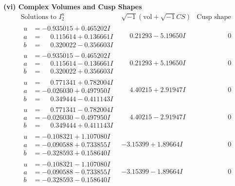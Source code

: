 \documentclass[1p]{elsarticle_modified}
\theoremstyle{definition}
\newcommand{\I}{\sqrt{-1}}
\begin{document}
\newpage\flushleft \textbf{(vi) Complex Volumes and Cusp Shapes}
$$\begin{array}{c|c|c}  
\text{Solutions to }I^u_{2}& \I (\text{vol} + \sqrt{-1}CS) & \text{Cusp shape}\\
 \hline 
\begin{aligned}
u &= -0.935015 + 0.465202 I \\
a &= \phantom{-}0.115614 + 0.136661 I \\
b &= \phantom{-}0.320022 - 0.356603 I\end{aligned}
 & \phantom{-}0.21293 - 5.19650 I & \phantom{-0.000000 } 0 \\ \hline\begin{aligned}
u &= -0.935015 - 0.465202 I \\
a &= \phantom{-}0.115614 - 0.136661 I \\
b &= \phantom{-}0.320022 + 0.356603 I\end{aligned}
 & \phantom{-}0.21293 + 5.19650 I & \phantom{-0.000000 } 0 \\ \hline\begin{aligned}
u &= \phantom{-}0.771341 + 0.782004 I \\
a &= -0.026030 + 0.497950 I \\
b &= \phantom{-}0.349444 - 0.411143 I\end{aligned}
 & \phantom{-}4.40215 + 2.91947 I & \phantom{-0.000000 } 0 \\ \hline\begin{aligned}
u &= \phantom{-}0.771341 - 0.782004 I \\
a &= -0.026030 - 0.497950 I \\
b &= \phantom{-}0.349444 + 0.411143 I\end{aligned}
 & \phantom{-}4.40215 - 2.91947 I & \phantom{-0.000000 } 0 \\ \hline\begin{aligned}
u &= -0.108321 + 1.107080 I \\
a &= -0.090588 + 0.733855 I \\
b &= -0.328593 + 0.158640 I\end{aligned}
 & -3.15399 + 1.89664 I & \phantom{-0.000000 } 0 \\ \hline\begin{aligned}
u &= -0.108321 - 1.107080 I \\
a &= -0.090588 - 0.733855 I \\
b &= -0.328593 - 0.158640 I\end{aligned}
 & -3.15399 - 1.89664 I & \phantom{-0.000000 } 0 \\ \hline\begin{aligned}

\end{aligned}
\end{array}$$
\end{document}
